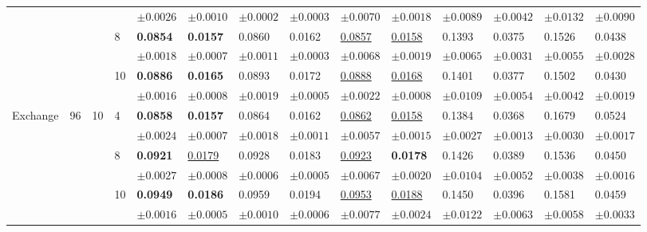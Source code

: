 {\begin{table}[tb]
{\begin{tabular}{p{10mm}p{2mm}p{2mm}p{4mm}p{10mm}p{10mm}p{10mm}p{10mm}p{10mm}p{10mm}p{10mm}p{10mm}p{10mm}p{10mm}}
& & & &$\pm 0.0026  $&$\pm 0.0010 $&$\pm 0.0002$&$\pm 0.0003 $&$\pm 0.0070  $&$\pm 0.0018$&$\pm 0.0089 $&$	\pm 0.0042  $&$\pm 0.0132  $&$\pm 0.0090$\\

& & &\multirow{2}{*}{8}& \textbf{0.0854}&\textbf{0.0157}&0.0860 
&0.0162 &\underline{0.0857} &\underline{0.0158}&0.1393 &0.0375 &0.1526  &0.0438  
\\

& & & &$\pm 0.0018  $&$\pm 0.0007 $&$\pm 0.0011$&$\pm 0.0003 $&$\pm 0.0068  $&$\pm 0.0019$&$\pm 0.0065 $&$	\pm 0.0031   $&$\pm0.0055  $&$\pm 0.0028$\\

& & &\multirow{2}{*}{10}& \textbf{0.0886}&\textbf{0.0165}&0.0893 &0.0172&\underline{0.0888}&\underline{0.0168}&0.1401 &0.0377 &0.1502 &0.0430
\\

& & & &$\pm 0.0016  $&$\pm 0.0008 $&$\pm 0.0019$&$\pm 0.0005 $&$\pm 0.0022  $&$\pm 0.0008$&$\pm 0.0109 $&$	\pm 0.0054   $&$\pm 0.0042  $&$\pm 0.0019$\\

\midrule
\multirow{6}{*}{Exchange} 
&\multirow{6}{*}{96}  &\multirow{6}{*}{10}&\multirow{2}{*}{4} &\textbf{0.0858}&\textbf{0.0157}&0.0864&0.0162&\underline{0.0862}&\underline{0.0158}&0.1384 &0.0368 &0.1679 &0.0524\\

& & & &$\pm 0.0024 $&$\pm 0.0007 $&$\pm 0.0018$&$\pm 0.0011 $&$\pm 0.0057  $&$\pm 0.0015$&$\pm 0.0027 $&$	\pm 0.0013   $&$\pm 0.0030  $&$\pm 0.0017$\\

& & &\multirow{2}{*}{8}& \textbf{0.0921}&\underline{0.0179}&0.0928&0.0183&\underline{0.0923}&\textbf{0.0178}&0.1426 &0.0389 &0.1536&0.0450
\\

& & & &$\pm 0.0027  $&$\pm 0.0008 $&$\pm 0.0006$&$\pm 0.0005 $&$\pm 0.0067 $&$\pm 0.0020$&$\pm 0.0104 $&$	\pm 0.0052   $&$\pm 0.0038  $&$\pm 0.0016$\\


& & &\multirow{2}{*}{10}&\textbf{0.0949}&\textbf{0.0186} &0.0959&0.0194&\underline{0.0953}&\underline{0.0188}&0.1450 &0.0396  &0.1581 &0.0459 \\

& & & &$\pm 0.0016  $&$\pm 0.0005 $&$\pm 0.0010$&$\pm 0.0006 $&$\pm 0.0077  $&$\pm 0.0024$&$\pm 0.0122 $&$	\pm 0.0063   $&$\pm 0.0058  $&$\pm 0.0033$\\




                             \bottomrule
\end{tabular}
}
\end{table}
}

